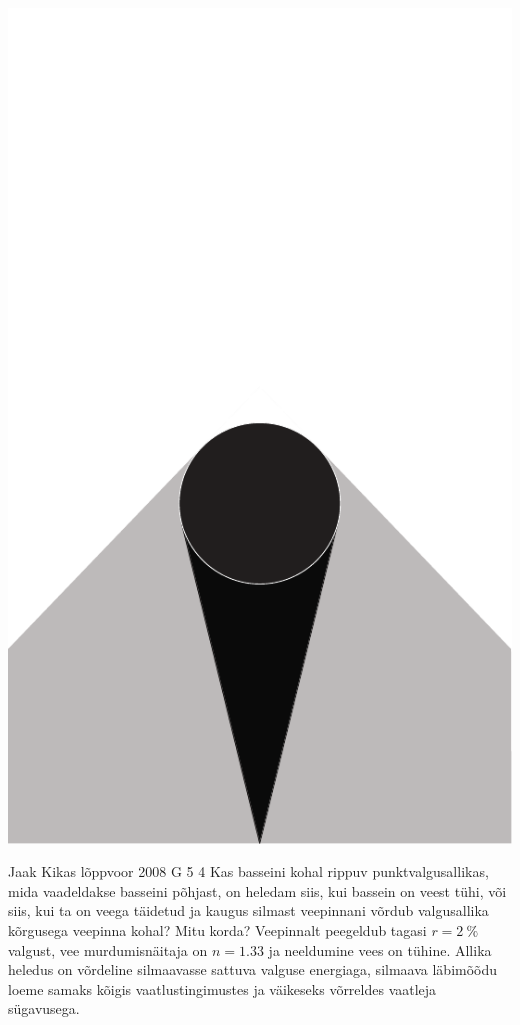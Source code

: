 \documentclass[11pt]{article}
\begin{document}
{{\begin{center}
	\includegraphics[height=0.8\textheight]{2007-v2g-06-yl}
\end{center}
\fi
}

{Jaak Kikas} %
{lõppvoor} %
{2008} %
{G 5} %
{4} %
{
\ifStatement
Kas basseini kohal rippuv punktvalgusallikas, mida vaadeldakse basseini põhjast, on heledam siis, kui bassein on veest tühi, või siis, kui ta on veega täidetud ja kaugus silmast veepinnani võrdub valgusallika kõrgusega veepinna kohal? Mitu korda? Veepinnalt peegeldub tagasi $r = \SI{2}{\%}$ valgust, vee murdumisnäitaja on $n = \num{1,33}$ ja neeldumine vees on tühine. Allika heledus on võrdeline silmaavasse sattuva valguse energiaga, silmaava läbimõõdu loeme samaks kõigis vaatlustingimustes ja väikeseks võrreldes vaatleja sügavusega.
\fi
}

}
\end{document}
